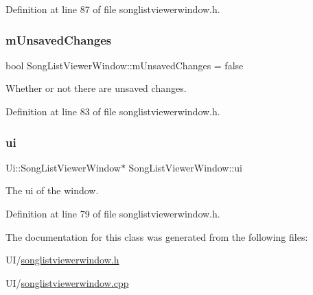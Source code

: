 Definition at line 87 of file songlistviewerwindow.\+h.

\mbox{\label{class_song_list_viewer_window_a150efbd08beb368c4acc65621d03d35d}} 
\subsubsection{\texorpdfstring{m\+Unsaved\+Changes}{mUnsavedChanges}}
{\footnotesize\ttfamily bool Song\+List\+Viewer\+Window\+::m\+Unsaved\+Changes = false\hspace{0.3cm}{\ttfamily [private]}}



Whether or not there are unsaved changes. 



Definition at line 83 of file songlistviewerwindow.\+h.

\mbox{\label{class_song_list_viewer_window_ac24fa09133b92a7b4cbd757f9b84258d}} 
\subsubsection{\texorpdfstring{ui}{ui}}
{\footnotesize\ttfamily Ui\+::\+Song\+List\+Viewer\+Window$\ast$ Song\+List\+Viewer\+Window\+::ui\hspace{0.3cm}{\ttfamily [private]}}



The ui of the window. 



Definition at line 79 of file songlistviewerwindow.\+h.



The documentation for this class was generated from the following files\+:\begin{DoxyCompactItemize}
\item 
U\+I/\mbox{\hyperlink{songlistviewerwindow_8h}{songlistviewerwindow.\+h}}\item 
U\+I/\mbox{\hyperlink{songlistviewerwindow_8cpp}{songlistviewerwindow.\+cpp}}\end{DoxyCompactItemize}
